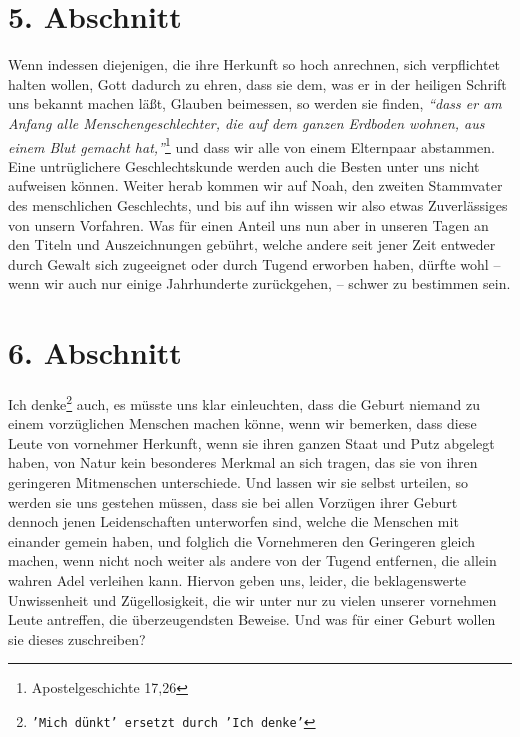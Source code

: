 \section{5. Abschnitt} \label{kap11_ab5}

Wenn indessen diejenigen, die ihre Herkunft so hoch anrechnen, sich verpflichtet
halten wollen, Gott dadurch zu ehren, dass sie dem, was er in der heiligen
Schrift uns bekannt machen läßt, Glauben beimessen, so werden sie finden,
\textit{"`dass
er am Anfang alle Menschengeschlechter, die auf dem ganzen Erdboden wohnen,
aus einem Blut gemacht hat,"'}\footnote{Apostelgeschichte 17,26}
und dass wir alle
von einem Elternpaar abstammen. Eine untrüglichere Geschlechtskunde werden auch
die Besten unter uns nicht aufweisen können. Weiter herab kommen wir auf
Noah, den zweiten Stammvater des menschlichen Geschlechts,
und bis auf ihn
wissen wir also etwas Zuverlässiges von unsern Vorfahren. Was für einen Anteil
uns nun aber in unseren Tagen an den Titeln und Auszeichnungen gebührt, welche
andere seit jener Zeit entweder durch Gewalt sich zugeeignet oder
durch Tugend
erworben haben, dürfte wohl -- wenn wir auch nur einige Jahrhunderte
zurückgehen, -- schwer zu bestimmen sein.

\section{6. Abschnitt} \label{kap11_ab6}

Ich denke\footnote{\texttt{'Mich dünkt' ersetzt durch 'Ich denke'}} auch, es
müsste uns klar einleuchten, dass die Geburt niemand zu einem
vorzüglichen Menschen machen könne, wenn wir bemerken, dass diese Leute von
vornehmer Herkunft, wenn sie ihren ganzen Staat und Putz abgelegt haben, von
Natur kein besonderes Merkmal an sich tragen, das sie von ihren geringeren
Mitmenschen unterschiede. Und lassen wir sie selbst urteilen, so werden sie
uns gestehen müssen, dass sie bei allen Vorzügen ihrer Geburt dennoch jenen
Leidenschaften unterworfen sind, welche die Menschen mit
einander gemein haben,
und folglich die Vornehmeren den Geringeren gleich machen, wenn nicht noch
weiter
als andere von der Tugend entfernen, die allein wahren Adel verleihen kann.
Hiervon geben uns, leider, die beklagenswerte Unwissenheit und Zügellosigkeit,
die wir unter nur zu vielen unserer vornehmen Leute antreffen, die
überzeugendsten Beweise. Und was für einer Geburt wollen sie dieses zuschreiben?

